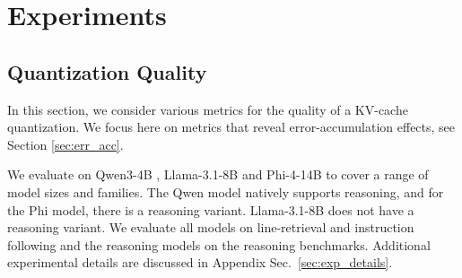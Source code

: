 \documentclass{article}
\begin{document}





\section{Experiments}
\label{sec:exp}

\subsection{Quantization Quality}
\label{sec:quality}
In this section, we consider various metrics for the quality of a KV-cache quantization. We focus here on metrics that reveal error-accumulation effects, see Section \ref{sec:err_acc}. 

We evaluate on Qwen3-4B \cite{yang2025qwen3technicalreport}, Llama-3.1-8B \cite{grattafiori2024llama} and Phi-4-14B \cite{abdin2024phi} to cover a range of model sizes and families. The Qwen model natively supports reasoning, and for the Phi model, there is a reasoning variant. Llama-3.1-8B does not have a reasoning variant. We evaluate all models on line-retrieval and instruction following and the reasoning models on the reasoning benchmarks. Additional experimental details are discussed in Appendix Sec.~\ref{sec:exp_details}.

\end{document}

